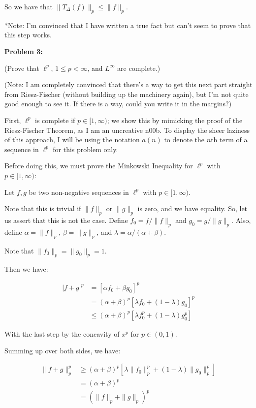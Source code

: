 \documentclass[a4paper,12pt]{article}
\newcommand{\tab}{\hspace{4mm}} %
\newcommand{\shunt}{\vspace{20mm}}
\newcommand{\absval}[1]{\left\lvert #1 \right\rvert}
\newcommand{\norm}[1]{\|#1\|}
\newcommand{\al}{\alpha} %
\newcommand{\be}{\beta}
\newcommand{\De}{\Delta}
\newcommand{\la}{\lambda}
\begin{document}
So we have that $\norm{T_\De(f)}_p \leq \norm{f}_p$. 

*Note: I'm convinced that I have written a true fact but can't seem to prove that this step works.

\shunt

{\bf Problem 3:} 

(Prove that $\ell^p$, $1\leq p < \infty$, and $L^\infty$ are complete.)

(Note: I am completely convinced that there's a way to get this next part straight from Riesz-Fischer (without building up the machinery again), but I'm not quite good enough to see it. If there is a way, could you write it in the margins?)

First, $\ell^p$ is complete if $p \in [1, \infty)$; we show this by mimicking the proof of the Riesz-Fischer Theorem, as I am an uncreative n00b. To display the sheer laziness of this approach, I will be using the notation $a(n)$ to denote the $n$th term of a sequence in $\ell^p$ for this problem only.

Before doing this, we must prove the Minkowski Inequality for $\ell^p$ with $p \in [1,\infty)$:

\tab Let $f,g$ be two non-negative sequences in $\ell^p$ with $p \in [1,\infty)$.

\tab Note that this is trivial if $\norm{f}_p$ or $\norm{g}_p$ is zero, and we have equality. So, let us assert that this is not the case. Define $f_0=f/\norm{f}_p$ and $g_0=g/\norm{g}_p$. Also, define $\al = \norm{f}_p$, $\be=\norm{g}_p$, and $\la = \al/(\al+\be)$.

\tab Note that $\norm{f_0}_p=\norm{g_0}_p=1$.

\tab Then we have:

\begin{align*}
\absval{f+g}^p &= [\al f_0 + \be g_0]^p\\
&= (\al+\be)^p[\la f_0 + (1-\la) g_0]^p\\
&\leq (\al+\be)^p[\la f_0^p + (1-\la) g_0^p]
\end{align*}

\tab With the last step by the concavity of $x^p$ for $p \in (0,1)$.

\tab Summing up over both sides, we have:

\begin{align*}
\norm{f+g}_p^p &\geq (\al+\be)^p[\la \norm{f_0}_p^p+(1-\la)\norm{g_0}_p^p]\\
&=(\al+\be)^p\\
&=(\norm{f}_p+\norm{g}_p)^p
\end{align*}
\end{document}

